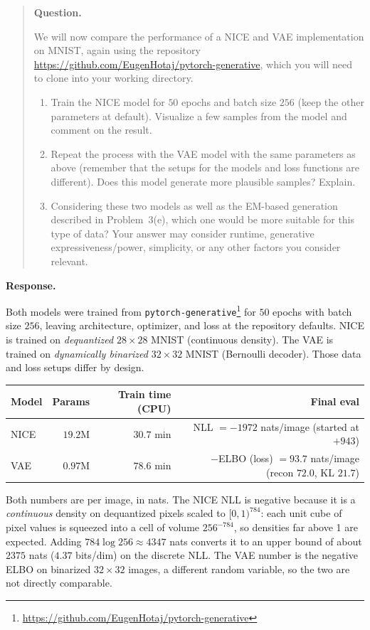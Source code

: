 \documentclass[11pt]{article}
\newenvironment{question}{%
  \par\addvspace{0.8em}%
  \begin{quote}\small
  \noindent\textbf{Question.}\enspace\ignorespaces
}{%
  \end{quote}%
  \par\nopagebreak
  \noindent\textbf{Response.}\par\nopagebreak\smallskip
}
\begin{document}
\begin{question}
We will now compare the performance of a NICE and VAE implementation on MNIST, again using the repository \url{https://github.com/EugenHotaj/pytorch-generative}, which you will need to clone into your working directory.
\begin{enumerate}
  \item[(a)] Train the NICE model for \(50\) epochs and batch size \(256\) (keep the other parameters at default). Visualize a few samples from the model and comment on the result.
  \item[(b)] Repeat the process with the VAE model with the same parameters as above (remember that the setups for the models and loss functions are different). Does this model generate more plausible samples? Explain.
  \item[(c)] Considering these two models as well as the EM-based generation described in Problem~3(e), which one would be more suitable for this type of data? Your answer may consider runtime, generative expressiveness/power, simplicity, or any other factors you consider relevant.
\end{enumerate}
\end{question}

Both models were trained from
\texttt{pytorch-generative}\footnote{\url{https://github.com/EugenHotaj/pytorch-generative}}
for \(50\) epochs with batch size \(256\), leaving architecture,
optimizer, and loss at the repository defaults. NICE is trained on
\emph{dequantized} \(28\times 28\) MNIST (continuous density). The VAE
is trained on \emph{dynamically binarized} \(32\times 32\) MNIST
(Bernoulli decoder). Those data and loss setups differ by design.

\begin{center}
\begin{tabular}{@{}lrrr@{}}
  \toprule
  Model & Params & Train time (CPU) & Final eval \\
  \midrule
  NICE & \(19.2\)M & \(30.7\) min & NLL \(=-1972\) nats/image (started at \(+943\)) \\
  VAE  & \(0.97\)M & \(78.6\) min & \(-\)ELBO (loss) \(=93.7\) nats/image (recon \(72.0\), KL \(21.7\)) \\
  \bottomrule
\end{tabular}
\end{center}

Both numbers are per image, in nats. The NICE NLL is negative because it
is a \emph{continuous} density on dequantized pixels scaled to
\([0,1)^{784}\): each unit cube of pixel values is squeezed into a cell of
volume \(256^{-784}\), so densities far above 1 are expected. Adding
\(784\log256\approx4347\) nats converts it to an upper bound of about
\(2375\) nats (\(4.37\) bits/dim) on the discrete NLL. The VAE number is
the negative ELBO on binarized \(32\times32\) images, a different random
variable, so the two are not directly comparable.
\end{document}
